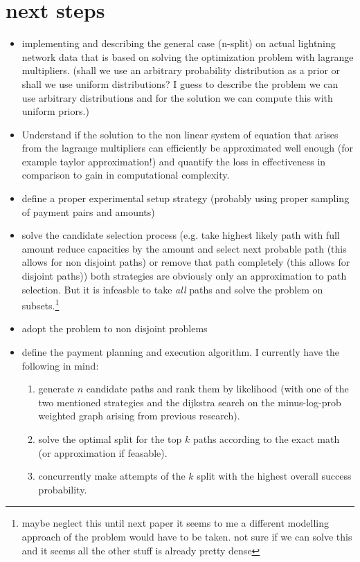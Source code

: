 \documentclass[10pt,twocolumn]{article}
\begin{document}
\section{next steps}
\begin{itemize}
\item implementing and describing the general case (n-split) on actual lightning network data that is based on solving the optimization problem with lagrange multipliers. (shall we use an arbitrary probability distribution as a prior or shall we use uniform distributions? I guess to describe the problem we can use arbitrary distributions and for the solution we can compute this with uniform priors.)
\item Understand if the solution to the non linear system of equation that arises from the lagrange multipliers can efficiently be approximated well enough (for example taylor approximation!) and quantify the loss in effectiveness in comparison to gain in computational complexity.
\item define a proper experimental setup strategy (probably using proper sampling of payment pairs and amounts)
\item solve the candidate selection process (e.g. take highest likely path with full amount reduce capacities by the amount and select next probable path (this allows for non disjoint paths) or remove that path completely (this allows for disjoint paths)) both strategies are obviously only an approximation to path selection. But it is infeasble to take \textit{all} paths and solve the problem on subsets.\footnote{maybe neglect this until next paper it seems to me a different modelling approach of the problem would have to be taken. not sure if we can solve this and it seems all the other stuff is already pretty dense}
\item adopt the problem to non disjoint problems
\item define the payment planning and execution algorithm. I currently have the following in mind:
  \begin{enumerate}
  \item generate $n$ candidate paths and rank them by likelihood (with one of the two mentioned strategies and the dijkstra search on the minus-log-prob weighted graph arising from previous research).
  \item solve the optimal split for the top $k$ paths according to the exact math (or approximation if feasable).
  \item concurrently make attempts of the $k$ split with the highest overall success probability.

\end{enumerate}
\end{itemize}
\end{document}
